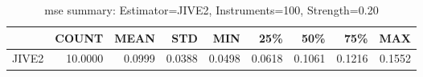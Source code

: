 \begin{table}[ht]
\centering
\caption{mse summary: Estimator=JIVE2, Instruments=100, Strength=0.20}
\begin{tabular}{lrrrrrrrr}
\toprule
 & COUNT & MEAN & STD & MIN & 25\% & 50\% & 75\% & MAX \\
\midrule
JIVE2 & 10.0000 & 0.0999 & 0.0388 & 0.0498 & 0.0618 & 0.1061 & 0.1216 & 0.1552 \\
\bottomrule
\end{tabular}
\end{table}

